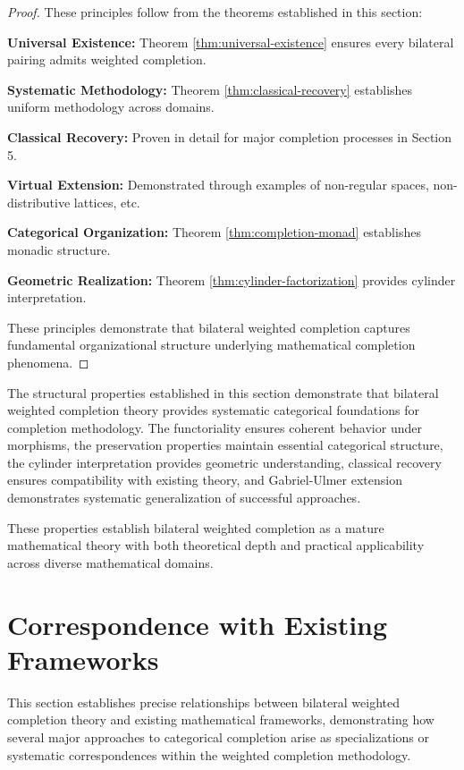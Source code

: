 \documentclass[11pt]{article}
\theoremstyle{plain}
\theoremstyle{definition}
\theoremstyle{remark}
\begin{document}
\begin{proof}
These principles follow from the theorems established in this section:

\textbf{Universal Existence:} Theorem \ref{thm:universal-existence} ensures every bilateral pairing admits weighted completion.

\textbf{Systematic Methodology:} Theorem \ref{thm:classical-recovery} establishes uniform methodology across domains.

\textbf{Classical Recovery:} Proven in detail for major completion processes in Section 5.

\textbf{Virtual Extension:} Demonstrated through examples of non-regular spaces, non-distributive lattices, etc.

\textbf{Categorical Organization:} Theorem \ref{thm:completion-monad} establishes monadic structure.

\textbf{Geometric Realization:} Theorem \ref{thm:cylinder-factorization} provides cylinder interpretation.

These principles demonstrate that bilateral weighted completion captures fundamental organizational structure underlying mathematical completion phenomena.
\end{proof}

The structural properties established in this section demonstrate that bilateral weighted completion theory provides systematic categorical foundations for completion methodology. The functoriality ensures coherent behavior under morphisms, the preservation properties maintain essential categorical structure, the cylinder interpretation provides geometric understanding, classical recovery ensures compatibility with existing theory, and Gabriel-Ulmer extension demonstrates systematic generalization of successful approaches.

These properties establish bilateral weighted completion as a mature mathematical theory with both theoretical depth and practical applicability across diverse mathematical domains.

\section{Correspondence with Existing Frameworks}

This section establishes precise relationships between bilateral weighted completion theory and existing mathematical frameworks, demonstrating how several major approaches to categorical completion arise as specializations or systematic correspondences within the weighted completion methodology.
\end{document}
